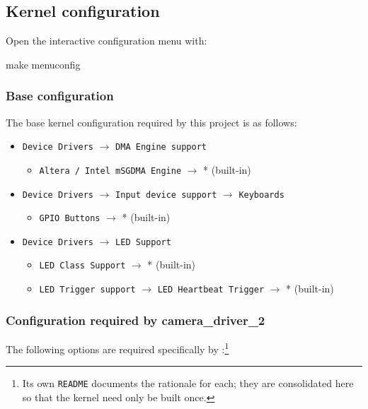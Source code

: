\subsection{Kernel configuration}

Open the interactive configuration menu with:

\begin{shellcodehost}
make menuconfig
\end{shellcodehost}

\subsubsection{Base configuration}

The base kernel configuration required by this project is as follows:

\begin{itemize}
    \item \texttt{Device Drivers} $\rightarrow$ \texttt{DMA Engine support}
    \begin{itemize}
        \item \texttt{Altera / Intel mSGDMA Engine} $\rightarrow$ * (built-in)
    \end{itemize}
    \item \texttt{Device Drivers} $\rightarrow$ \texttt{Input device support} $\rightarrow$ \texttt{Keyboards}
    \begin{itemize}
        \item \texttt{GPIO Buttons} $\rightarrow$ * (built-in)
    \end{itemize}
    \item \texttt{Device Drivers} $\rightarrow$ \texttt{LED Support}
    \begin{itemize}
        \item \texttt{LED Class Support} $\rightarrow$ * (built-in)
        \item \texttt{LED Trigger support} $\rightarrow$ \texttt{LED Heartbeat Trigger} $\rightarrow$ * (built-in)
    \end{itemize}
\end{itemize}
\subsubsection{Configuration required by camera\_driver\_2}
The following options are required specifically by :\footnote{Its own \texttt{README} documents the rationale for each; they are consolidated here so that the kernel need only be built once.}

